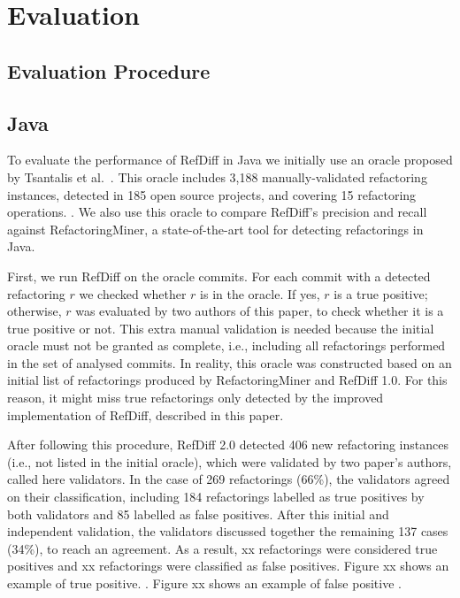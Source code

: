 \section{Evaluation}

\subsection{Evaluation Procedure}

\subsection{Java}

To evaluate the performance of RefDiff in Java we initially use an oracle proposed by Tsantalis et al.~\cite{xx}. This oracle includes 3,188 manually-validated refactoring instances, detected in 185 open source projects, and covering 15 refactoring operations. . We also use this oracle to compare RefDiff's precision and recall against RefactoringMiner, a state-of-the-art tool for detecting refactorings in Java.

First, we run RefDiff on the oracle commits. For each commit with a detected refactoring $r$ we checked whether $r$ is in the oracle. If yes, $r$ is a true positive; otherwise, $r$ was evaluated by two authors of this paper, to check whether it is a true positive or not. This extra manual validation is needed because the initial oracle must not be granted as complete, i.e., including all refactorings performed in the set of analysed commits. In reality, this oracle was constructed based on an initial list of refactorings produced by RefactoringMiner and RefDiff 1.0. For this reason, it might miss true refactorings only detected by the improved implementation of RefDiff, described in this paper.

After following this procedure, RefDiff 2.0 detected 406 new refactoring instances (i.e., not listed in the initial oracle), which were  validated by two paper's authors, called here validators.  In the case of 269 refactorings (66\%), the validators agreed on their classification, including 184 refactorings labelled as true positives by both validators and 85 labelled as false positives. After this initial and independent validation, the validators discussed together the remaining 137 cases (34\%), to reach an agreement. As a result, xx refactorings were considered true positives and xx refactorings were classified as false positives. Figure xx shows an example of true positive. . Figure xx shows an example of false positive .

